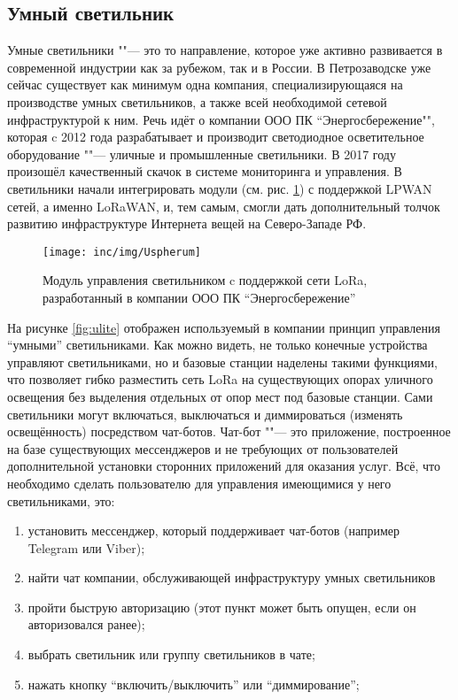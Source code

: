 \subsection{Умный светильник}

Умные светильники ""--- это то направление, которое уже активно развивается в современной индустрии как за рубежом, так и в России.
В Петрозаводске уже сейчас существует как минимум одна компания, специализирующаяся на производстве умных светильников, а также всей необходимой сетевой инфраструктурой к ним. 
Речь идёт о компании ООО ПК ``Энергосбережение"", которая c 2012 года разрабатывает и производит светодиодное осветительное оборудование ""--- уличные и промышленные светильники.
В 2017 году произошёл качественный скачок в системе мониторинга и управления.
В светильники начали интегрировать модули (см. рис. \ref{fig:uspherum}) с 
поддержкой LPWAN сетей, а именно LoRaWAN, и, тем самым, смогли дать 
дополнительный толчок развитию инфраструктуре Интернета вещей на Северо-Западе 
РФ.

\begin{figure}[!h]
  \centering
  \texttt{[image: inc/img/Uspherum]}
  \caption{Модуль управления светильником c поддержкой сети LoRa, разработанный в компании ООО ПК ``Энергосбережение'' \cite{isbergsite}}
  \label{fig:uspherum}
\end{figure}

На рисунке \ref{fig:ulite} отображен используемый в компании принцип управления ``умными'' светильниками. 
Как можно видеть, не только конечные устройства управляют светильниками, но и базовые станции наделены такими функциями, что позволяет гибко разместить сеть LoRa на существующих опорах уличного освещения без выделения отдельных от опор мест под базовые станции.
Сами светильники могут включаться, выключаться и диммироваться (изменять освещённость) посредством чат-ботов. 
Чат-бот ""--- это приложение, построенное на базе существующих мессенджеров и не требующих от пользователей дополнительной установки сторонних приложений для оказания услуг.
Всё, что необходимо сделать пользователю для управления имеющимися у него светильниками, это:
\begin{enumerate}
 \item установить мессенджер, который поддерживает чат-ботов (например Telegram или Viber);
 \item найти чат компании, обслуживающей инфраструктуру умных светильников
 \item пройти быструю авторизацию (этот пункт может быть опущен, если он авторизовался ранее);
 \item выбрать светильник или группу светильников в чате;
 \item нажать кнопку ``включить/выключить'' или ``диммирование'';
\end{enumerate}

